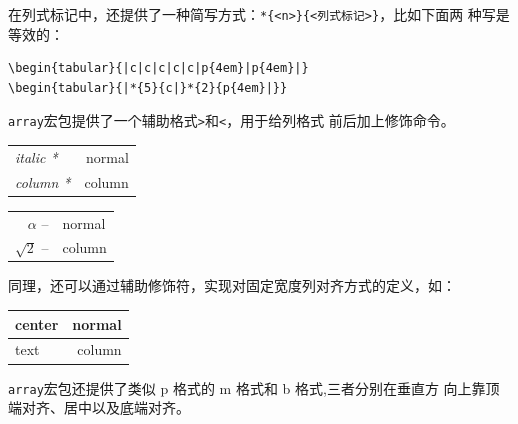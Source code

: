 \documentclass{article}
\begin{document}
在列式标记中，还提供了一种简写方式：\verb!*{<n>}{<列式标记>}!，比如下面两
种写是等效的：

\begin{verbatim}
\begin{tabular}{|c|c|c|c|c|p{4em}|p{4em}|}
\begin{tabular}{|*{5}{c|}*{2}{p{4em}|}}
\end{verbatim}

\texttt{array}宏包提供了一个辅助格式\texttt{>}和\texttt{<}，用于给列格式
前后加上修饰命令。
   
\begin{table}[htpb]
  \centering
  \begin{tabular}{ >{\itshape}l<{*}   r}
    \hline
    italic & normal \\
    column & column \\
    \hline
  \end{tabular}
\end{table}

\begin{table}[H]
  \centering
  \begin{tabular}{>{$}r<{$ --} @{\ }l}
    \alpha & normal \\
    \sqrt{2} & column \\
  \end{tabular}
\end{table}

同理，还可以通过辅助修饰符，实现对固定宽度列对齐方式的定义，如：

\begin{table}[H]
  \centering
  \begin{tabular}{ | >{\centering\arraybackslash}p{8em} | r |}
    \hline
    center & normal \\
    \hline
    text & column \\
    \hline
  \end{tabular}
\end{table}

\texttt{array}宏包还提供了类似 p 格式的 m 格式和 b 格式,三者分别在垂直方
向上靠顶端对齐、居中以及底端对齐。
\end{document}
